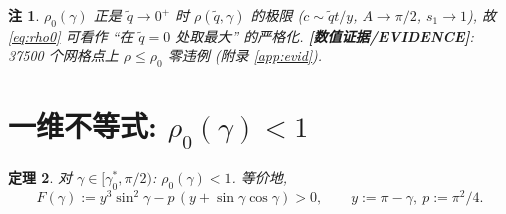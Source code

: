 \documentclass[UTF8]{ctexart}
\newtheorem{theorem}{定理}[section]
\newtheorem{remark}[theorem]{注}
\newcommand{\EVID}{\textbf{[数值证据/EVIDENCE]}}
\begin{document}
\begin{remark}
$\rho_0(\gamma)$ 正是 $\tilde q\to0^+$ 时 $\rho(\tilde q,\gamma)$ 的极限
($c\sim\tilde q t/y$, $A\to\pi/2$, $s_1\to1$), 故 \eqref{eq:rho0} 可看作
``在 $\tilde q=0$ 处取最大'' 的严格化. \EVID{}: 37500 个网格点上
$\rho\le\rho_0$ 零违例 (附录 \ref{app:evid}).
\end{remark}

\section{\texorpdfstring{一维不等式: $\rho_0(\gamma)<1$}{一维不等式: rho0(gamma)<1}}\label{sec:rho0}

\begin{theorem}\label{thm:rho0}
对 $\gamma\in[\gamma_0^*,\pi/2)$: $\rho_0(\gamma)<1$. 等价地,
\begin{equation}
	F(\gamma):=y^3\sin^2\gamma-p\,(y+\sin\gamma\cos\gamma)>0,
	\qquad y:=\pi-\gamma,\ p:=\pi^2/4.
	\label{eq:F}
\end{equation}
\end{theorem}
\end{document}
